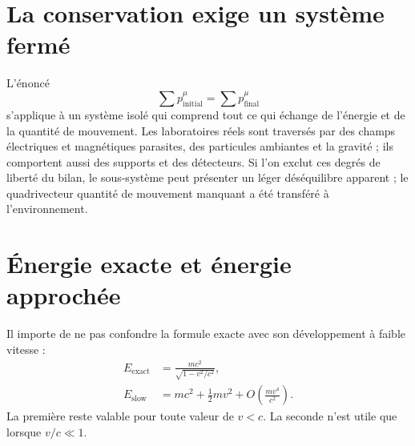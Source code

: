 \section{La conservation exige un système fermé}

L’énoncé
\begin{equation}
\sum p^\mu_{\mathrm{initial}}
=
\sum p^\mu_{\mathrm{final}}
\end{equation}
s’applique à un système isolé qui comprend tout ce qui échange de l’énergie et de la quantité de mouvement. Les laboratoires réels sont traversés par des champs électriques et magnétiques parasites, des particules ambiantes et la gravité ; ils comportent aussi des supports et des détecteurs. Si l’on exclut ces degrés de liberté du bilan, le sous-système peut présenter un léger déséquilibre apparent ; le quadrivecteur quantité de mouvement manquant a été transféré à l’environnement.

\begin{classroomqa}
\end{classroomqa}

\begin{classroomqa}
\end{classroomqa}

\section{Énergie exacte et énergie approchée}

Il importe de ne pas confondre la formule exacte avec son développement à faible vitesse :
\begin{align}
E_{\mathrm{exact}}
&=
\frac{mc^2}{\sqrt{1-v^2/c^2}},
\label{eq:sr3-exact-repeated}\\
E_{\mathrm{slow}}
&=
mc^2+\frac12mv^2
+O\!\left(\frac{mv^4}{c^2}\right).
\label{eq:sr3-approx-repeated}
\end{align}
La première reste valable pour toute valeur de \(v<c\). La seconde n’est utile que lorsque \(v/c\ll1\).

